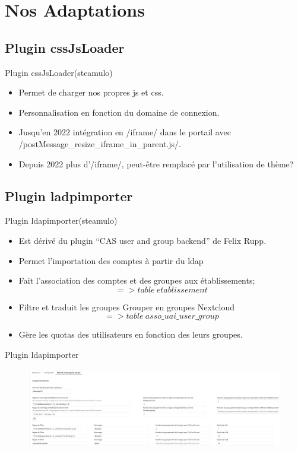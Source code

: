 \documentclass[aspectratio=169]{beamer}
\begin{document}
\section{Nos Adaptations}
\subsection{Plugin cssJsLoader}
\begin{frame}[fragile]{Plugin cssJsLoader}{(steamulo)}
\begin{itemize}
\item Permet de charger nos propres js et css.
\item Personnalisation en fonction du domaine de connexion.
\item Jusqu'en 2022 intégration en \code/iframe/ dans le portail avec \code/postMessage_resize_iframe_in_parent.js/.
\item Depuis 2022 plus d'\code/iframe/, peut-être remplacé par l'utilisation de thème? 
\end{itemize}
\end{frame} 

\subsection{Plugin ladpimporter}
\begin{frame}{Plugin ldapimporter}{(steamulo)} %
\begin{itemize}
\item Est dérivé du plugin ``CAS user and group backend'' de Felix Rupp.
\item Permet l'importation des comptes à partir du ldap
\item Fait l'association des comptes et des groupes aux établissements;
		{\small $$ => table\ etablissement $$} 
\item Filtre et traduit les groupes Grouper en groupes Nextcloud
		{\small $$ => table\ asso\_uai\_user\_group $$ } 
\item Gère les quotas des utilisateurs en fonction des leurs groupes.
\end{itemize}
\end{frame}


\begin{frame}{Plugin ldapimporter} %
\begin{figure}
\includegraphics[width=\textwidth, height=0.85\textheight]{ldapimporter.png}
\end{figure}
\end{frame}
\end{document}
